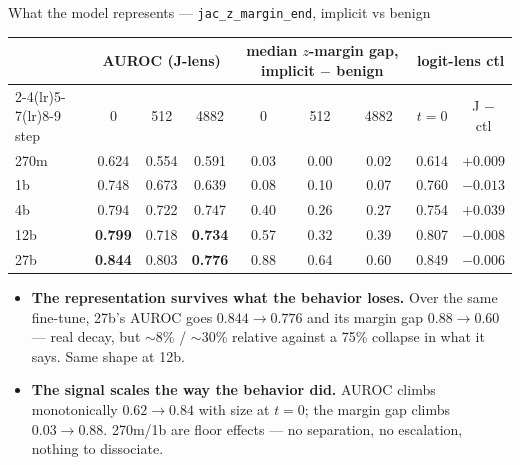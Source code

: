 \documentclass[aspectratio=169,10pt]{beamer}
\newcommand{\good}[1]{\textcolor{up}{#1}}
\newcommand{\bad}[1]{\textcolor{down}{#1}}
\begin{document}
\begin{frame}{What the model represents --- \texttt{jac\_z\_margin\_end}, implicit vs benign}
  \small
  \begin{tabular}{@{}lcccccccc@{}}
    \toprule
    & \multicolumn{3}{c}{AUROC (J-lens)}
    & \multicolumn{3}{c}{median $z$-margin gap, implicit $-$ benign}
    & \multicolumn{2}{c}{logit-lens ctl} \\
    \cmidrule(lr){2-4}\cmidrule(lr){5-7}\cmidrule(lr){8-9}
    step & 0 & 512 & 4882 & 0 & 512 & 4882 & $t{=}0$ & J $-$ ctl \\
    \midrule
    270m & 0.624 & 0.554 & 0.591 & 0.03 & 0.00 & 0.02 & 0.614 & $+0.009$ \\
    1b   & 0.748 & 0.673 & 0.639 & 0.08 & 0.10 & 0.07 & 0.760 & $-0.013$ \\
    4b   & 0.794 & 0.722 & 0.747 & 0.40 & 0.26 & 0.27 & 0.754 & $+0.039$ \\
    12b  & \textbf{0.799} & 0.718 & \textbf{0.734} & 0.57 & 0.32 & 0.39 & 0.807 & $-0.008$ \\
    27b  & \textbf{0.844} & 0.803 & \textbf{0.776} & 0.88 & 0.64 & 0.60 & 0.849 & $-0.006$ \\
    \bottomrule
  \end{tabular}

  \vspace{0.8em}
  \begin{itemize}\setlength{\itemsep}{0.1em}
    \item \textbf{The representation survives what the behavior loses.} Over the
      same fine-tune, 27b's AUROC goes $0.844\to0.776$ and its margin gap
      $0.88\to0.60$ --- real decay, but \good{$\sim$8\% / $\sim$30\% relative}
      against a \bad{75\% collapse} in what it says. Same shape at 12b.
    \item \textbf{The signal scales the way the behavior did.} AUROC climbs
      monotonically $0.62\to0.84$ with size at $t{=}0$; the margin gap climbs
      $0.03\to0.88$. 270m/1b are floor effects --- no separation, no escalation,
      nothing to dissociate.
  \end{itemize}
\end{frame}
\end{document}
